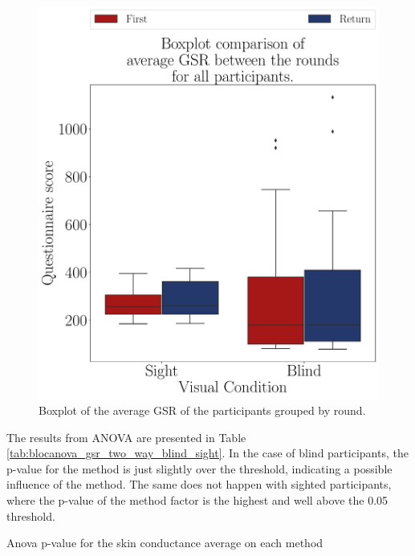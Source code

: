 \begin{figure}[!htb]
    \centering
    \includegraphics[width = 0.75\linewidth]{3 - Resultados/Figuras/boxplot_gsr_avg_4_rounds.pdf}
    \caption{Boxplot of the average GSR of the participants grouped by round.}
    \label{fig:boxplot_gsr_avg_4_rounds}
\end{figure}

The results from ANOVA are presented in Table \ref{tab:blocanova_gsr_two_way_blind_sight}. In the case of blind participants, the p-value for the method is just slightly over the threshold, indicating a possible influence of the method. The same does not happen with sighted participants, where the p-value of the method factor is the highest and well above the 0.05 threshold.

\begin{table}[!htb]
    \caption{Anova p-value for the skin conductance average on each method}
    \label{tab:blocanova_gsr_two_way_blind_sight}
\begin{minipage}{0.45\linewidth}
    
\end{minipage}%
\begin{minipage}{0.05\linewidth}
    \hfill
\end{minipage}%
\begin{minipage}{0.45\linewidth}
    
\end{minipage}
\end{table}